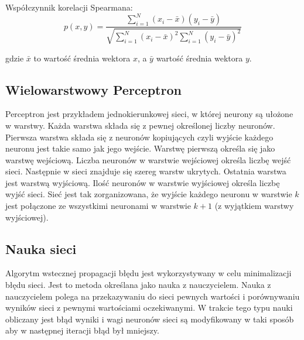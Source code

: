 \documentclass{classrep}
\begin{document}
Współczynnik korelacji Spearmana:
\begin{equation}
  p(x,y) = \frac{\displaystyle\sum_{i = 1}^{N}(x_i - \bar{x})(y_i -
\bar{y})}{\sqrt{\displaystyle \sum_{i=1}^N (x_i - \bar{x})^2 \displaystyle
\sum_{i=1}^N (y_i - \bar{y})^2}}
\end{equation}

gdzie $\bar{x}$  to wartość średnia wektora $x$, a $\bar{y}$ wartość średnia wektora $y$.

\subsection{Wielowarstwowy Perceptron}	
Perceptron jest przykładem jednokierunkowej sieci, w której neurony są ułożone w warstwy.
Każda warstwa składa się z pewnej określonej liczby neuronów. Pierwsza warstwa składa się z neuronów kopiujących czyli wyjście każdego neuronu jest takie samo jak jego wejście. Warstwę pierwszą określa się jako warstwę wejściową. Liczba neuronów w warstwie wejściowej	
określa liczbę wejść sieci. Następnie w sieci znajduje się szereg warstw	
ukrytych. Ostatnia warstwa jest warstwą wyjściową. Ilość neuronów w	
warstwie wyjściowej określa liczbę wyjść sieci. Sieć jest tak zorganizowana, że	
wyjście każdego neuronu w warstwie $k$ jest połączone ze wszystkimi neuronami w
warstwie $k+1$ (z wyjątkiem warstwy wyjściowej).			
\subsection{Nauka sieci}
Algorytm wstecznej propagacji błędu jest wykorzystywany w celu minimalizacji błędu sieci.
Jest to metoda określana jako nauka z nauczycielem. Nauka z nauczycielem polega na przekazywaniu do sieci pewnych wartości i porównywaniu wyników sieci z pewnymi wartościami oczekiwanymi. W trakcie tego typu nauki obliczany jest błąd wyniki i wagi neuronów sieci są modyfikowany w taki sposób aby w następnej iteracji błąd był mniejszy.
\end{document}
